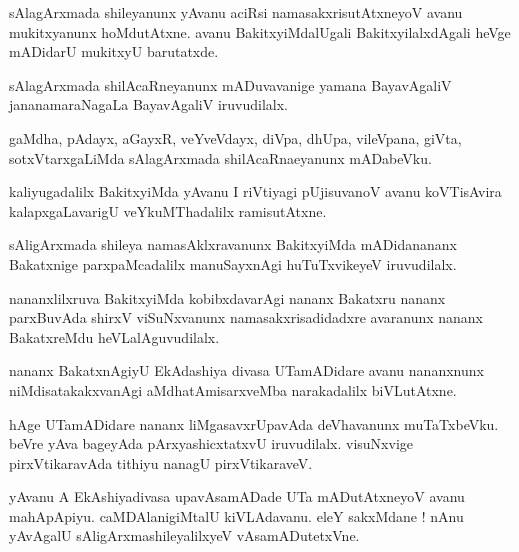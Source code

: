 \documentclass{article}
\begin{document}
\begin{mn}%
sAlagArxmada shileyanunx yAvanu aciRsi namasakxrisutAtxneyoV avanu mukitxyanunx hoMdutAtxne. avanu 
BakitxyiMdalUgali BakitxyilalxdAgali heVge mADidarU mukitxyU barutatxde.
\end{mn}

\begin{mn}%
sAlagArxmada shilAcaRneyanunx mADuvavanige yamana BayavAgaliV jananamaraNagaLa BayavAgaliV 
iruvudilalx.
\end{mn}

\begin{mn}%
gaMdha, pAdayx, aGayxR, veYveVdayx, diVpa, dhUpa, vileVpana, giVta, sotxVtarxgaLiMda sAlagArxmada 
shilAcaRnaeyanunx mADabeVku.
\end{mn}

\begin{mn}%
kaliyugadalilx BakitxyiMda yAvanu  I riVtiyagi pUjisuvanoV avanu koVTisAvira kalapxgaLavarigU 
veYkuMThadalilx ramisutAtxne.
\end{mn}

\begin{mn}%
sAligArxmada shileya namasAklxravanunx BakitxyiMda mADidanananx Bakatxnige parxpaMcadalilx 
manuSayxnAgi huTuTxvikeyeV iruvudilalx.
\end{mn}

\begin{mn}%
nananxlilxruva BakitxyiMda kobibxdavarAgi nananx Bakatxru nananx parxBuvAda shirxV viSuNxvanunx 
namasakxrisadidadxre avaranunx nananx BakatxreMdu heVLalAguvudilalx.
\end{mn}

\begin{mn}%
nananx BakatxnAgiyU EkAdashiya divasa UTamADidare avanu nananxnunx niMdisatakakxvanAgi 
aMdhatAmisarxveMba narakadalilx biVLutAtxne.
\end{mn}

\begin{mn}%
hAge UTamADidare nananx liMgasavxrUpavAda deVhavanunx muTaTxbeVku. beVre yAva bageyAda 
pArxyashicxtatxvU iruvudilalx. visuNxvige pirxVtikaravAda tithiyu nanagU pirxVtikaraveV.
\end{mn}

\begin{mn}%
yAvanu A EkAshiyadivasa upavAsamADade UTa mADutAtxneyoV avanu mahApApiyu. caMDAlanigiMtalU 
kiVLAdavanu. eleY sakxMdane ! nAnu yAvAgalU sAligArxmashileyalilxyeV vAsamADutetxVne.
\end{mn}
\end{document}
